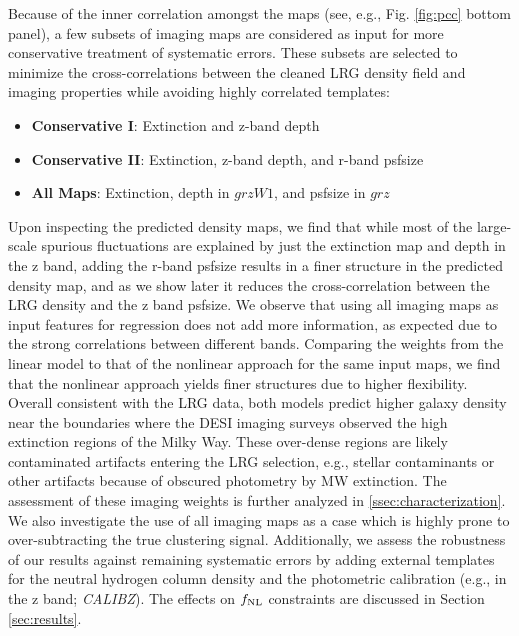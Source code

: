 Because of the inner correlation amongst the maps (see, e.g., Fig. \ref{fig:pcc} bottom panel), a few subsets of imaging maps are considered as input for more conservative treatment of systematic errors. These subsets are selected to minimize the cross-correlations between the cleaned LRG density field and imaging properties while avoiding highly correlated templates:
\begin{itemize}
\item \textbf{Conservative I}: Extinction and z-band depth
\item \textbf{Conservative II}: Extinction, z-band depth, and r-band psfsize
\item \textbf{All Maps}: Extinction, depth in $grzW1$, and psfsize in $grz$
\end{itemize}

Upon inspecting the predicted density maps, we find that while most of the large-scale spurious fluctuations are explained by just the extinction map and depth in the z band, adding the r-band psfsize results in a finer structure in the predicted density map, and as we show later it reduces the cross-correlation between the LRG density and the z band psfsize. We observe that using all imaging maps as input features for regression does not add more information, as expected due to the strong correlations between different bands. Comparing the weights from the linear model to that of the nonlinear approach for the same input maps, we find that the nonlinear approach yields finer structures due to higher flexibility. Overall consistent with the LRG data, both models predict higher galaxy density near the boundaries where the DESI imaging surveys observed the high extinction regions of the Milky Way. These over-dense regions are likely contaminated artifacts entering the LRG selection, e.g., stellar contaminants or other artifacts because of obscured photometry by MW extinction. The assessment of these imaging weights is further analyzed in \ref{ssec:characterization}. We also investigate the use of all imaging maps as a case which is highly prone to over-subtracting the true clustering signal. Additionally, we assess the robustness of our results against remaining systematic errors by adding external templates for the neutral hydrogen column density \citep{2016A&A...594A.116H} and the photometric calibration (e.g., in the z band; \textit{CALIBZ}). The effects on $f_{\rm NL}$ constraints are discussed in Section \ref{sec:results}.


